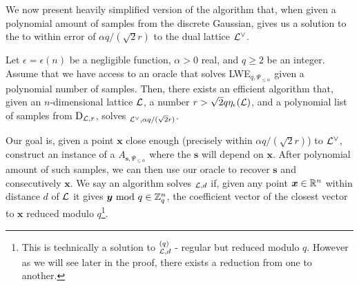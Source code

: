 We now present heavily simplified version of the algorithm that, when given a polynomial amount of samples from the discrete Gaussian, gives us a solution to the  to within error of $\alpha q /(\sqrt{2} r)$ to the dual lattice $\mathcal{L}^{\vee}$.
\begin{lemma}\label{classical}
	Let $\epsilon = \epsilon(n)$ be a negligible function, $\alpha > 0$ real, and $q \geq 2$ be an integer. Assume that we have access to an oracle that solves LWE$_{q, \Psi_{\leq \alpha}}$ given a polynomial number of samples. Then, there exists an efficient algorithm that, given an $n$-dimensional lattice $\mathcal{L}$, a number $r > \sqrt{2}q \eta_{\epsilon}(\mathcal{L})$, and a polynomial list of samples from $\text{D}_{\mathcal{L},r}$, solves $_{\mathcal{L}^{\vee},\alpha q/(\sqrt{2}r)}$.
\end{lemma}
Our goal is, given a point $\bm{x}$ close enough (precisely within $\alpha q/(\sqrt{2}r)$) to $\mathcal{L}^{\vee}$, construct an instance of a $A_{\bm{s}, \Psi_{\leq \alpha}}$ where the $\bm{s}$ will depend on $\bm{x}$. After polynomial amount of such samples, we can then use our oracle to recover $\bm{s}$ and consecutively $\bm{x}$. We say an algorithm solves $_{\mathcal{L}, d}$ if, given any point $\boldsymbol{x} \in \mathbb{R}^n$ within distance $d$ of $\mathcal{L}$ it gives $\boldsymbol{y} \text{ mod } q \in \mathbb{Z}_q^n$, the coefficient vector of the closest vector to $\bm{x}$ reduced modulo $q$\footnote{This is technically a solution to $^{(q)}_{\mathcal{L}, d}$ - regular  but reduced modulo $q$. However as we will see later in the proof, there exists a reduction from one to another.}.

